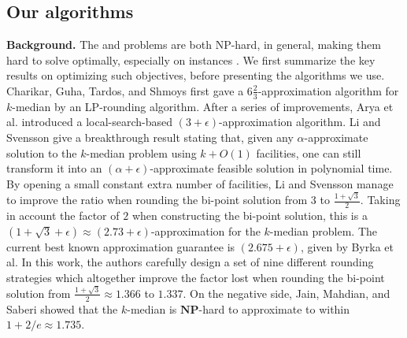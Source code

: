 

\subsection*{Our algorithms}

\noindent
\textbf{Background.}
The \probstatic{} and \probinc{} problems are both NP-hard, in general, making them hard to solve optimally,
especially on instances .  We first summarize the key results on optimizing
such objectives, before presenting the algorithms we use.
Charikar, Guha, Tardos, and Shmoys \cite{charikar_kmed} first gave a $6\frac{2}{3}$-approximation algorithm for $k$-median by an LP-rounding algorithm. After a series of improvements, Arya et al. \cite{arya} introduced a local-search-based $(3+\epsilon)$-approximation algorithm. Li and Svensson \cite{li_svensson} give a breakthrough result stating that, given any $\alpha$-approximate solution to the $k$-median problem using $k+O(1)$ facilities, one can still transform it into an $(\alpha+\epsilon)$-approximate feasible solution in polynomial time. By opening a small constant extra number of facilities, Li and Svensson manage to improve the ratio when rounding the bi-point solution from $3$ to $\frac{1+\sqrt{3}}{2}$. Taking in account the factor of $2$ when constructing the bi-point solution, this is a $(1+\sqrt{3}+\epsilon) \approx (2.73+\epsilon)$-approximation for the $k$-median problem. The current best known approximation guarantee is $(2.675+\epsilon)$, given by Byrka et al. \cite{byrka_kmed} In this work, the authors carefully design a set of nine different rounding strategies which altogether improve the factor lost when rounding the bi-point solution from $\frac{1+\sqrt{3}}{2} \approx 1.366$ to $1.337$. On the negative side, Jain, Mahdian, and Saberi \cite{jms} showed that the $k$-median is $\mathbf{NP}$-hard to approximate to within $1+2/e \approx 1.735$.

